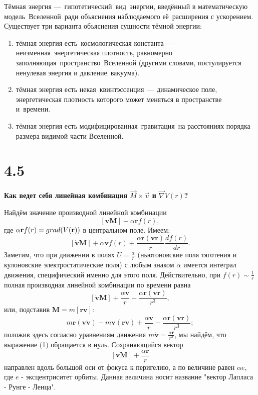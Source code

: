 \documentclass[a4paper,14pt]{article}
\begin{document}
Тёмная энергия — гипотетический вид энергии, введённый в математическую модель Вселенной ради объяснения наблюдаемого её расширения с ускорением.
Существует три варианта объяснения сущности тёмной энергии:
\begin{enumerate}
	\item тёмная энергия есть космологическая константа — неизменная энергетическая плотность, равномерно заполняющая пространство Вселенной (другими словами, постулируется ненулевая энергия и давление вакуума).
	\item тёмная энергия есть некая квинтэссенция — динамическое поле, энергетическая плотность которого может меняться в пространстве и времени.
	\item тёмная энергия есть модифицированная гравитация на расстояниях порядка размера видимой части Вселенной.
\end{enumerate}


\section*{4.5}

\begin{center}
	\LARGE{\textbf{Как ведет себя линейная комбинация $\overrightarrow{M} \times \overrightarrow{v}$ и $\overrightarrow{\nabla}V(r)$?}}\\
\end{center}

Найдём значение производной линейной комбинации $$[\textbf{vM}] + \alpha \textbf{r}f(r),$$ где $\alpha \textbf{r}f(r) = grad (V(\textbf r))$ в центральном поле. Имеем:
$$[\mathbf{\dot{v}M}] + {\alpha \textbf{v}}f(r) + \frac {\alpha \textbf{r} (\textbf{vr})}{r}\frac {df(r)}{dr}.$$
Заметим, что при движении в полях $ U = \frac{\alpha}{r}$ (ньютоновские поля тяготения и кулоновские электростатические поля) с любым знаком $\alpha$  имеется интеграл движения, специфический именно для этого поля. 
Действительно, при $f(r) \sim \frac {1}{r}$  полная производная линейной комбинации по времени равна
$$[\mathbf{\dot{v}M}] + \frac {\alpha \textbf{v}}{r} - \frac {\alpha \textbf{r} (\textbf{vr})}{r^3},$$
или, подставив $\textbf{M} = m[\textbf{rv}]:$
$$m\mathbf{r(v\dot{v})} - m\mathbf{v(r\dot{v})} + \frac {\alpha \textbf{v}}{r} - \frac {\alpha \textbf{r} (\textbf{vr})}{r^3};$$
положив здесь согласно уравнениям движения $ m\mathbf{\dot{v}} = \frac {\alpha \textbf{r}}{r^3}$, мы найдём, что выражение (1) обращается в нуль.
Сохраняющийся вектор $$[\textbf{vM}] + \frac {\alpha \textbf{r}}{r}$$ направлен вдоль большой оси от фокуса к перигелию, а по величине равен $\alpha e$, где $e$ - эксцентриситет орбиты. Данная величина носит название "вектор Лапласа - Рунге - Ленца".
\end{document}
